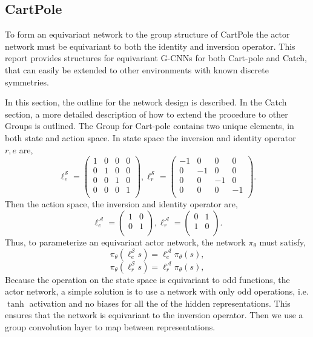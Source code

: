 \subsection{CartPole}

To form an equivariant network to the group structure of CartPole the actor network must be equivariant to both the identity and inversion operator. This report provides structures for equivariant G-CNNs for both Cart-pole and Catch, that can easily be extended to other environments with known discrete symmetries.


In this section, the outline for the network design is described. In the Catch section, a more detailed description of how to extend the procedure to other Groups is outlined.
The Group for Cart-pole contains two unique elements, in both state and action space. In state space the inversion and identity operator $r, e$ are,
\begin{equation}
	\ell^\mathcal{S}_e =
	\begin{pmatrix}
		1 & 0 & 0 & 0 \\
		0 & 1 & 0 & 0 \\
		0 & 0 & 1 & 0 \\
		0 & 0 & 0 & 1 \\
	\end{pmatrix},
	\ell^\mathcal{S}_r =
	\begin{pmatrix}
		-1 & 0  & 0  & 0  \\
		0  & -1 & 0  & 0  \\
		0  & 0  & -1 & 0  \\
		0  & 0  & 0  & -1 \\
	\end{pmatrix}.
\end{equation}
Then the action space, the inversion and identity operator are,
\begin{equation}
	\ell^\mathcal{A}_e =
	\begin{pmatrix}
		1 & 0 \\
		0 & 1 \\
	\end{pmatrix},
	\ell^\mathcal{A}_r =
	\begin{pmatrix}
		0 & 1 \\
		1 & 0 \\
	\end{pmatrix}.
\end{equation}
Thus, to parameterize an equivariant actor network, the network $\pi_\theta$ must satisfy,
\begin{equation}
	\pi_\theta(\ell^\mathcal{S}_e s) = \ell^\mathcal{A}_e \pi_\theta(s),
\end{equation}
\begin{equation}
	\pi_\theta(\ell^\mathcal{S}_r s) = \ell^\mathcal{A}_r \pi_\theta(s),
\end{equation}
Because the operation on the state space is equivariant to odd functions, the actor network, a simple solution is to use a network with only odd operations, i.e. $\tanh$ activation and no biases for all the of the hidden representations. This ensures that the network is equivariant to the inversion operator. Then we use a group convolution layer to map between representations.

